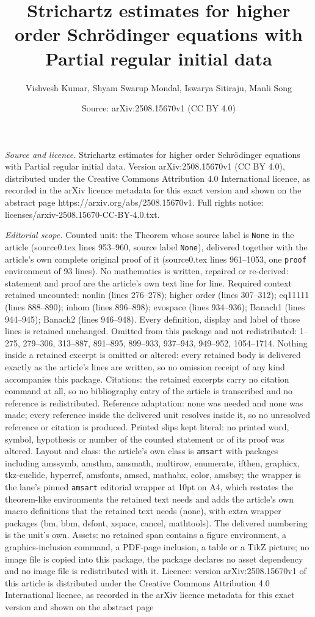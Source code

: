 \documentclass[10pt,a4paper]{amsart}
\title[Strichartz estimates for higher order Schr\"odinger equation]{Strichartz estimates for higher order Schr\"odinger equations with Partial regular initial data}
\author{Vishvesh Kumar, Shyam Swarup Mondal, Iswarya Sitiraju, Manli Song}
\date{Source: arXiv:2508.15670v1 (CC BY 4.0)}
\begin{document}
\maketitle

\noindent\emph{Source and licence.} Strichartz estimates for higher order Schr\"odinger equations with Partial regular initial data. Version arXiv:2508.15670v1 (CC BY 4.0), distributed under the Creative Commons Attribution 4.0 International licence, as recorded in the arXiv licence metadata for this exact version and shown on the abstract page https://arxiv.org/abs/2508.15670v1. Full rights notice: licenses/arxiv-2508.15670-CC-BY-4.0.txt.\par\smallskip

\noindent\textit{Editorial scope.} Counted unit: the Theorem whose source label is \texttt{None} in the article (source0.tex lines 953--960, source label \texttt{None}), delivered together with the article's own complete original proof of it (source0.tex lines 961--1053, one \texttt{proof} environment of 93 lines). No mathematics is written, repaired or re-derived: statement and proof are the article's own text line for line. Required context retained uncounted: nonlin (lines 276--278); higher order (lines 307--312); eq11111 (lines 888--890); inhom (lines 896--898); evospace (lines 934--936); Banach1 (lines 944--945); Banach2 (lines 946--948). Every definition, display and label of those lines is retained unchanged. Omitted from this package and not redistributed: 1--275, 279--306, 313--887, 891--895, 899--933, 937--943, 949--952, 1054--1714. Nothing inside a retained excerpt is omitted or altered: every retained body is delivered exactly as the article's lines are written, so no omission receipt of any kind accompanies this package. Citations: the retained excerpts carry no citation command at all, so no bibliography entry of the article is transcribed and no reference is redistributed. Reference adaptation: none was needed and none was made; every reference inside the delivered unit resolves inside it, so no unresolved reference or citation is produced. Printed slips kept literal: no printed word, symbol, hypothesis or number of the counted statement or of its proof was altered. Layout and class: the article's own class is \texttt{amsart} with packages including amssymb, amsthm, amsmath, multirow, enumerate, ifthen, graphicx, tkz-euclide, hyperref, amsfonts, amscd, mathabx, color, amsbsy; the wrapper is the lane's pinned \texttt{amsart} editorial wrapper at 10pt on A4, which restates the theorem-like environments the retained text needs and adds the article's own macro definitions that the retained text needs (none), with extra wrapper packages (bm, bbm, dsfont, xspace, cancel, mathtools). The delivered numbering is the unit's own. Assets: no retained span contains a figure environment, a graphics-inclusion command, a PDF-page inclusion, a table or a TikZ picture; no image file is copied into this package, the package declares no asset dependency and no image file is redistributed with it. Licence: version arXiv:2508.15670v1 of this article is distributed under the Creative Commons Attribution 4.0 International licence, as recorded in the arXiv licence metadata for this exact version and shown on the abstract page 
\end{document}

